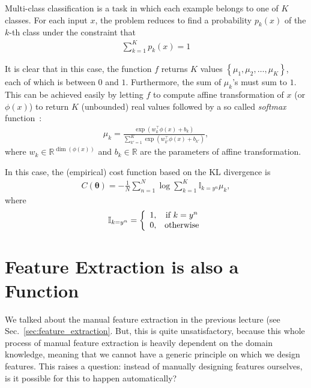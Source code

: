 \documentclass{report}
\newcommand{\vects}[1]{\boldsymbol{#1}}
\newcommand{\TT}[0]{\vects{\theta}}
\newcommand{\RR}[0]{\mathbb{R}}
\newcommand{\II}[0]{\mathbb{I}}
\begin{document}
Multi-class classification is a task in which each example belongs to one of $K$
classes. For each input $x$, the problem reduces to find a probability $p_k(x)$
of the $k$-th class under the constraint that 
\begin{align*}
    \sum_{k=1}^K p_k(x)=1
\end{align*}

It is clear that in this case, the function $f$ returns $K$ values $\left\{
\mu_1, \mu_2, \ldots, \mu_K \right\}$, each of which is between $0$ and $1$.
Furthermore, the sum of $\mu_k$'s must sum to $1$. This can be achieved easily
by letting $f$ to compute affine transformation of $x$ (or $\phi(x)$) to return
$K$ (unbounded) real values followed by a so called {\em softmax}
function~\cite{Bridle1990}:
\begin{align}
    \label{eq:softmax}
    \mu_k = \frac{\exp(w_k^\top \phi(x) + b_k)}{\sum_{k'=1}^K \exp(w_{k'}^\top
    \phi(x) + b_{k'})},
\end{align}
where $w_k \in \RR^{\dim(\phi(x))}$ and $b_k \in \RR$ are the parameters of
affine transformation.

In this case, the (empirical) cost function based on the KL divergence is
\begin{align}
    \label{eq:cat_crossentropy}
    C(\TT) = -\frac{1}{N} \sum_{n=1}^N \log \sum_{k=1}^K \II_{k=y^n} \mu_k,
\end{align}
where 
\begin{align}
    \label{eq:indicator_function}
    \II_{k=y^n} = \left\{ 
        \begin{array}{c c}
            1, & \text{if }k=y^n \\
            0, & \text{otherwise}
        \end{array}
        \right.
\end{align}

\section{Feature Extraction is also a Function}
\label{sec:feature_ext}

We talked about the manual feature extraction in the previous lecture (see
Sec.~\ref{sec:feature_extraction}. But, this is quite unsatisfactory, because
this whole process of manual feature extraction is heavily dependent on the
domain knowledge, meaning that we cannot have a generic principle on which we
design features. This raises a question: instead of manually designing features
ourselves, is it possible for this to happen automatically?
\end{document}
